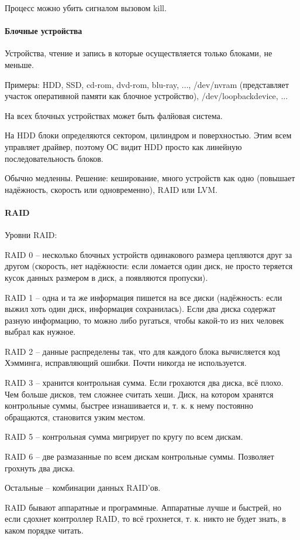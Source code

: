 \documentclass[a4paper,10pt]{article}
\begin{document}
Процесс можно убить сигналом вызовом kill.

\paragraph{Блочные устройства}
Устройства, чтение и запись в которые осуществляется только блоками, не меньше.

Примеры: HDD, SSD, cd-rom, dvd-rom, blu-ray, ..., /dev/nvram (представляет участок оперативной памяти как блочное устройство), /dev/loopbackdevice, ...

На всех блочных устройствах может быть фалйовая система.

На HDD блоки определяются сектором, цилиндром и поверхностью. Этим всем управляет драйвер, поэтому ОС видит HDD просто как линейную последовательность блоков.

Обычно медленны. Решение: 
кеширование, 
много устройств как одно (повышает надёжность, скорость или одновременно),
RAID или LVM.
\paragraph{RAID}
Уровни RAID:

RAID 0 -- несколько блочных устройств одинакового размера цепляются друг за другом (скорость, нет надёжности: если ломается один диск, не просто теряется кусок данных размером в диск, а появляются пропуски).

RAID 1 -- одна и та же информация пишется на все диски (надёжность: если выжил хоть один диск, информация сохранилась). Если два диска содержат разную информацию, то можно либо ругаться, чтобы какой-то из них человек выбрал как нужное.

RAID 2 -- данные распределены так, что для каждого блока вычисляется код Хэмминга, исправляющий ошибки. Почти никогда не используется.

RAID 3 -- хранится контрольная сумма. Если грохаются два диска, всё плохо. Чем больше дисков, тем сложнее считать хеши. Диск, на котором хранятся контрольные суммы, быстрее изнашивается и, т. к. к нему постоянно обращаются, становится узким местом.

RAID 5 -- контрольная сумма мигрирует по кругу по всем дискам.

RAID 6 -- две размазанные по всем дискам контрольные суммы. Позволяет грохнуть два диска.

Остальные -- комбинации данных RAID'ов.

RAID бывают аппаратные и программные. Аппаратные лучше и быстрей, но если сдохнет контроллер RAID, то всё грохнется, т. к. никто не будет знать, в каком порядке читать. 
\end{document}
